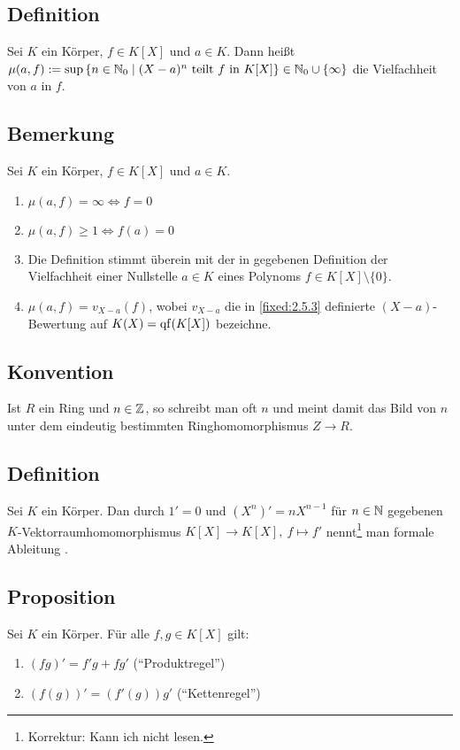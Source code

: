\subsection{Definition} Sei $K$ ein Körper, $f \in K[X]$ und $a \in K$. Dann heißt $\mu(a,f) := \sup \left\{n \in \mathbb N_0 \mid (X-a)^n \text{ teilt $f$ in $K[X]$}\right\} \in \mathbb N_0 \cup \{\infty\}$ die Vielfachheit von $a$ in $f$.

\subsection{Bemerkung} Sei $K$ ein Körper, $f \in K[X]$ und $a \in K$.
\begin{enumerate}[label=(\alph*)]
	\item
		$\mu(a,f) = \infty \iff f=0$
		
	\item
		$\mu(a,f) \geq 1 \iff f(a) =0$
		
	\item
		Die Definition stimmt überein mit der in  gegebenen Definition der Vielfachheit einer Nullstelle $a \in K$ eines Polynoms $f \in K[X]\setminus\{0\}$.
		
	\item
		$\mu(a,f) = v_{X-a}(f)$, wobei $v_{X-a}$ die in \ref{fixed:2.5.3} definierte $(X-a)$-Bewertung auf $K(X) = \operatorname{qf}(K[X])$ bezeichne.
\end{enumerate}

\subsection{Konvention} Ist $R$ ein Ring und $n \in \mathbb Z$, so schreibt man oft $n$ und meint damit das Bild von $n$ unter dem eindeutig bestimmten Ringhomomorphismus $Z \to R$.

\subsection{Definition} Sei $K$ ein Körper. Dan durch $1'=0$ und $(X^n)' = nX^{n-1}$ für $n \in \mathbb N$ gegebenen $K$-Vektorraumhomomorphismus $K[X] \to K[X],~f \mapsto f'$ nennt\footnote{Korrektur: Kann ich nicht lesen.} man formale Ableitung .

\subsection{Proposition} Sei $K$ ein Körper. Für alle $f,g \in K[X]$ gilt:
\begin{enumerate}[label=(\alph*)]
	\item
		$(fg)' = f'g + fg'$ ("`Produktregel"')
		
	\item
		$(f(g))' = (f'(g))g'$ ("`Kettenregel"')
\end{enumerate}

